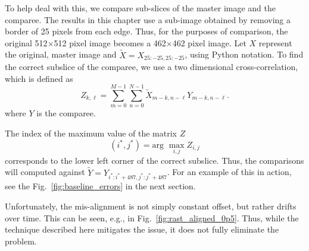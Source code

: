 \documentclass[twocolumn,twoside]{IEEEtran/IEEEtran}
\begin{document}
To help deal with this, we compare sub-slices of the master image and the
comparee. The results in this chapter use a sub-image obtained by removing a
border of 25 pixels from each edge. Thus, for the purposes of comparison, the
original 512$\times$512 pixel image becomes a 462$\times$462 pixel image. Let
$X$ represent the original, master image and ${\tilde X=X_{25:-25, 25:-25}}$,
using Python notation. To find the correct subslice of the comparee, we use a
two dimensional cross-correlation, which is defined as
\begin{equation}
  Z_{k,\ell} = \sum_{m=0}^{M-1}\sum_{n=0}^{N-1} \tilde{X}_{m-k, n-\ell}Y_{m-k, n-\ell}.
\end{equation}
where $Y$ is the comparee.

The index of the maximum value of the matrix $Z$
\begin{equation}
  (i^*,j^*) = \textrm{arg~} \max_{i,j}Z_{i,j}
\end{equation}
corresponds to the lower left corner of the correct subslice. Thus, the
comparisons will computed against $\tilde{Y} = Y_{i^*:i^*+487, j^*:j^*+487}$.
For an example of this in action, see the Fig.~\ref{fig:baseline_errors} in the
next section.

Unfortunately, the mis-alignment is not simply constant offset, but rather
drifts over time. This can be seen, e.g., in Fig.~\ref{fig:rast_aligned_0p5}.
Thus, while the technique described here mitigates the issue, it does not fully
eliminate the problem.



\end{document}
